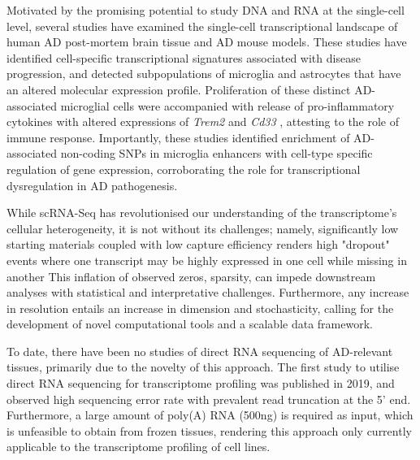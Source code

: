 Motivated by the promising potential to study DNA and RNA at the single-cell level, several studies have examined the single-cell transcriptional landscape of human AD post-mortem brain tissue\cite{Mathys2019,Nott2019,Thrupp2020,Olah2020,Leng2021,Young2021} and AD mouse models\cite{Keren-Shaul2017,Mathys2017}. These studies have identified cell-specific transcriptional signatures associated with disease progression, and detected subpopulations of microglia and astrocytes that have an altered molecular expression profile. Proliferation of these distinct AD-associated microglial cells were accompanied with release of pro-inflammatory cytokines\cite{Mathys2017} with altered expressions of \textit{Trem2} and \textit{Cd33} \cite{Mathys2019,Frigerio2019}, attesting to the role of immune response. Importantly, these studies identified enrichment of AD-associated non-coding SNPs in microglia enhancers with cell-type specific regulation of gene expression\cite{Tansey2018,Nott2019,Young2021,Novikova2021}, corroborating the role for transcriptional dysregulation in AD pathogenesis.   

While scRNA-Seq has revolutionised our understanding of the transcriptome's cellular heterogeneity, it is not without its challenges; namely, significantly low starting materials coupled with low capture efficiency renders high "dropout" events where one transcript may be highly expressed in one cell while missing in another\cite{Lahnemann2020,Adil2021} This inflation of observed zeros, sparsity, can impede downstream analyses with statistical and interpretative challenges\cite{Adil2021}. Furthermore, any increase in resolution entails an increase in dimension and stochasticity, calling for the development of novel computational tools and a scalable data framework\cite{Lahnemann2020}. 

\newpage
{}
To date, there have been no studies of direct RNA sequencing of AD-relevant tissues, primarily due to the novelty of this approach. The first study to utilise direct RNA sequencing for transcriptome profiling was published in 2019, and observed high sequencing error rate with prevalent read truncation at the 5' end\cite{Workman2019a}. Furthermore, a large amount of poly(A) RNA (500ng) is required as input, which is unfeasible to obtain from frozen tissues, rendering this approach only currently applicable to the transcriptome profiling of cell lines.      
  

